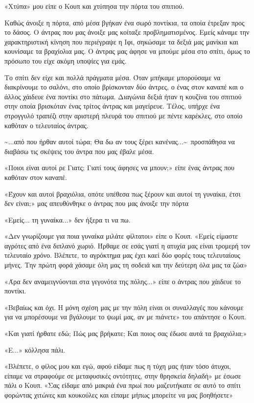 \documentclass[12pt,twoside, openany]{book}
\begin{document}
«Χτύπα» μου είπε ο Κουπ και χτύπησα την πόρτα του σπιτιού.

Καθώς άνοιξε η πόρτα, από μέσα βγήκαν ένα σωρό ποντίκια, τα οποία έτρεξαν προς το δάσος. Ο άντρας που μας άνοιξε μας κοίταξε προβληματισμένος. Εμείς κάναμε την χαρακτηριστική κίνηση που περιέγραψε η Ιφι, σηκώσαμε τα δεξιά μας μανίκια και κουνίσαμε τα βραχίολια μας. Ο άντρας μας άφησε να μπούμε μέσα στο σπίτι, όμως το πρόσωπο του είχε ακόμη υποψίες για εμάς.

Το σπίτι δεν είχε και πολλά πράγματα μέσα. Όταν μπήκαμε μπορούσαμε να διακρίνουμε το σαλόνι, στο οποίο βρίσκονταν δύο άντρες, ο ένας στον καναπέ και ο άλλος χάιδευε ένα ποντίκι στο πάτωμα. Διαγώνια δεξιά ήταν η κουζίνα του σπιτιού στην οποία βρισκόταν ένας τρίτος άντρας και μαγείρευε. Τέλος, υπήρχε ένα στρογγυλό τραπέζι στην αριστερή πλευρά του σπιτιού με πέντε καρέκλες, στο οποίο καθόταν ο τελευταίος άντρας.

\textasciitilde ...από που ήρθαν αυτοί τώρα; Θα δω αν τους ξέρει κανένας...\textasciitilde \  προσπάθησα να διαβάσω τις σκέψεις του άντρα που μας έβαλε μέσα.

«Ποιοι είναι αυτοί ρε Γιατς; Γιατί τους άφησες να μπουν;» είπε ένας άντρας που καθόταν στον καναπέ.

«Έχουν και αυτοί βραχιόλια, οπότε υπέθεσα πως ξέρουν και αυτοί τη γυναίκα, έτσι δεν είναι;» μας απευθύνθηκε ο άντρας που μας άνοιξε την πόρτα

«Εμείς... τη γυναίκα...» δεν ήξερα τι να πω.

«Δεν γνωρίζουμε για ποια γυναίκα μιλάτε φίλτατοι» είπε ο Κουπ. «Εμείς είμαστε αγρότες από ένα διπλανό χωριό. Ήρθαμε σε εσάς γιατί η ατυχία μας είναι τρομερή τον τελευταίο χρόνο. Βλέπετε, το αγρόκτημα μας έχει καεί δύο φορές τους τελευταίους μήνες. Την πρώτη φορά χάσαμε όλη μας τη σοδειά και την δεύτερη όλα μας τα ζώα»

«Άρα δεν αναμειγνύονται στα γεγονότα της πόλης...» είπε ο άντρας που χάιδευε το ποντίκι.

«Βεβαίως και όχι. Η μόνη σχέση μας με την πόλη είναι οι συναλλαγές που κάνουμε για να μπορέσουμε να βγάλουμε το ψωμί μας, αν με πιάνετε» του απάντησε ο Κουπ.

«Και γιατί ήρθατε εδώ; Πώς μας βρήκατε; Και ποιος σας έδωσε αυτά τα βραχιόλια;»

«Ε...» κόλλησα πάλι.

«Βλέπετε, ο φίλος μου και εγώ, αφού είδαμε πως η τύχη μας ήταν τόσο άτυχοι, είπαμε να στραφούμε σε μεταφυσικές οντότητες, στην θρησκεία δηλαδή» με έσωσε πάλι ο Κουπ. «Σας είδαμε από μακριά ένα πρωί που μαζευτήκατε σε αυτό το σπίτι φορώντας χιτώνες και κουκούλες και είπαμε μήπως μπορείτε να μας βοηθήσετε»
\end{document}
